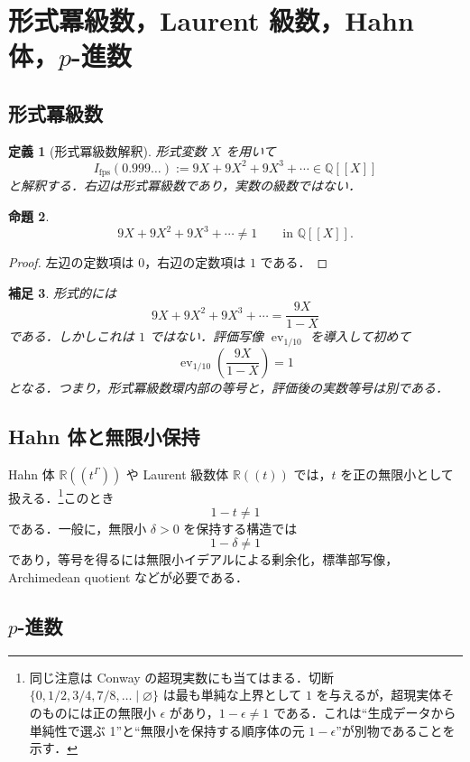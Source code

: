 \documentclass[a4paper,11pt]{ltjsarticle}
\theoremstyle{jpdef}
\newtheorem{definition}{定義}[section]
\newtheorem{remark}[definition]{補足}
\theoremstyle{jpthm}
\newtheorem{proposition}[definition]{命題}
\newcommand{\Q}{\mathbb{Q}}
\newcommand{\R}{\mathbb{R}}
\newcommand{\ev}{\operatorname{ev}}
\begin{document}
\section{形式冪級数，Laurent 級数，Hahn 体，\(p\)-進数}

\subsection{形式冪級数}

\begin{definition}[形式冪級数解釈]
形式変数 \(X\) を用いて
\[
  I_{\mathrm{fps}}(0.999\ldots):=9X+9X^2+9X^3+\cdots\in\Q[[X]]
\]
と解釈する．右辺は形式冪級数であり，実数の級数ではない．
\end{definition}

\begin{proposition}
\[
  9X+9X^2+9X^3+\cdots\ne1
  \qquad\text{in }\Q[[X]].
\]
\end{proposition}

\begin{proof}
左辺の定数項は \(0\)，右辺の定数項は \(1\) である．
\end{proof}

\begin{remark}
形式的には
\[
  9X+9X^2+9X^3+\cdots=\frac{9X}{1-X}
\]
である．しかしこれは \(1\) ではない．評価写像 \(\ev_{1/10}\) を導入して初めて
\[
  \ev_{1/10}\left(\frac{9X}{1-X}\right)=1
\]
となる．つまり，形式冪級数環内部の等号と，評価後の実数等号は別である．
\end{remark}

\subsection{Hahn 体と無限小保持}

Hahn 体 \(\R((t^\Gamma))\) や Laurent 級数体 \(\R((t))\) では，\(t\) を正の無限小として扱える．\footnote{同じ注意は Conway の超現実数にも当てはまる．切断 \(\{0,1/2,3/4,7/8,\ldots\mid\varnothing\}\) は最も単純な上界として \(1\) を与えるが，超現実体そのものには正の無限小 \(\epsilon\) があり，\(1-\epsilon\ne1\) である．これは``生成データから単純性で選ぶ 1''と``無限小を保持する順序体の元 \(1-\epsilon\)''が別物であることを示す．}このとき
\[
  1-t\ne1
\]
である．一般に，無限小 \(\delta>0\) を保持する構造では
\[
  1-\delta\ne1
\]
であり，等号を得るには無限小イデアルによる剰余化，標準部写像，Archimedean quotient などが必要である．

\subsection{\(p\)-進数}
\end{document}

